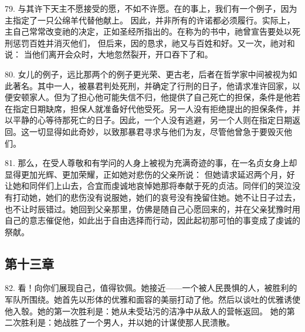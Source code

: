 79. 与其许下天主不愿接受的愿，不如不许愿。在的事上，我们有一个例子，因为主指定了一只公绵羊代替他献上。 因此，并非所有的许诺都必须履行。实际上，主自己常常改变祂的决定，正如圣经所指出的。在称为的书中，祂曾宣告要处以死刑惩罚百姓并消灭他们， 但后来，因的恳求，祂又与百姓和好。又一次，祂对和说： 当他们离开会众时，大地忽然裂开，开口吞下了和。\par

80. 女儿的例子，远比那两个的例子更光荣、更古老，后者在哲学家中间被视为如此著名。其中一人，被暴君判处死刑，并确定了行刑的日子，他请求准许回家，以便安顿家人。但为了担心他可能失信不归，他提供了自己死亡的担保，条件是他若在指定日期缺席，担保人就准备好代他受死。另一人没有拒绝提出的担保条件，并以平静的心等待那死亡的日子。因此，一个人没有逃避，另一个人则在指定日期返回。这一切显得如此奇妙，以致那暴君寻求与他们为友，尽管他曾急于要毁灭他们。\par

81. 那么，在受人尊敬和有学问的人身上被视为充满奇迹的事，在一名贞女身上却显得更加光辉、更加荣耀，正如她对悲伤的父亲所说： 但她请求延迟两个月，好让她和同伴们上山去，合宜而虔诚地哀悼她那将奉献于死的贞洁。同伴们的哭泣没有打动她，她们的悲伤没有说服她，她们的哀号没有挽留住她。她不让日子过去，也不让时辰错过。她回到父亲那里，仿佛是随自己心愿回来的，并在父亲犹豫时用自己的意志催促他，如此出于自由选择而行动，因此起初那可怕的事变成了虔诚的祭献。\par


\subsection{第十三章}

\par

82. 看！向你们展现自己，值得钦佩。她接近——一个被人民畏惧的人，被胜利的军队所围绕。她首先以形体的优雅和面容的美丽打动了他。然后以谈吐的优雅诱使他入彀。她的第一次胜利是：她从未受玷污的洁净中从敌人的营帐返回。 她的第二次胜利是：她战胜了一个男人，并以她的计谋使那人民溃散。\par

